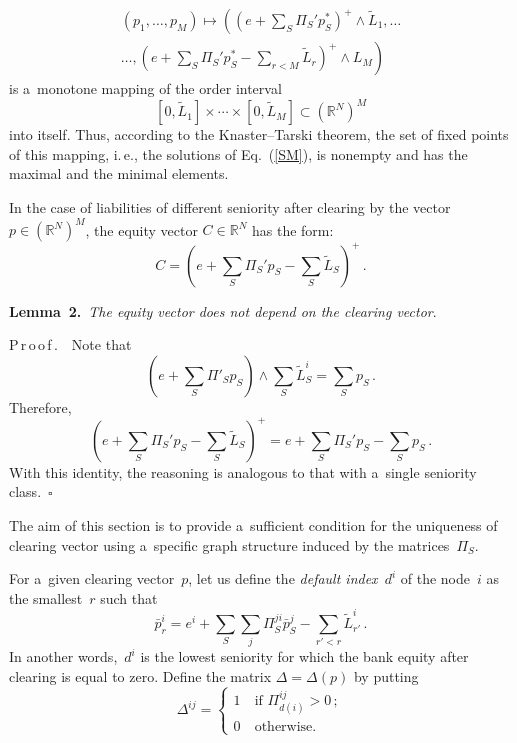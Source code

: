 \begin{multicols}{2}
\vspace*{-4pt}

\noindent
\begin{multline*}
\left(p_1,\ldots,p_M\right)\mapsto \left(
\left(e+\sum\limits_S \Pi_S'p_{S}^* \right)^+\wedge \tilde L_1 
,\ldots\right.\\
\left.\ldots,\left(e+\sum\limits_S \Pi_S'p_{S}^*-\sum\limits_{r<M}\tilde L_r\right)^+ 
\wedge L_M 
\right)
\end{multline*}
is a~monotone mapping of the order interval 
$$
[0,\tilde L_1] \times\cdots\times 
[0,\tilde L_M]\subset (\mathbb{R}^N)^M
$$ 
into itself.
 Thus, according to the Knaster--Tarski theorem, the set of fixed points of this 
mapping, i.\,e., the solutions of Eq.~(\ref{SM}), is nonempty and has the 
maximal and the minimal elements.

In the case of liabilities of different seniority after clearing by the vector 
$p\in (\mathbb{R}^N)^M$,  the equity vector $C\in \mathbb{R}^N$ has the form:
$$
C=\left(e+\sum\limits_S \Pi_S'p_{S}-\sum\limits_S \tilde L_S\right)^+\,.
$$


\noindent
\textbf{Lemma~2.}\
\textit{The equity vector does not depend on the clearing vector}.

\vspace*{2pt}

\noindent
P\,r\,o\,o\,f\,.\ \  Note that
$$
\left(e+\sum\limits_S\Pi'_Sp_S\right)\wedge \sum\limits_S \tilde L^i_S=\sum\limits_S p_S\,.
$$
Therefore,
$$
\left(e+\sum\limits_S \Pi_S'p_{S}-\sum\limits_S \tilde L_S\right)^+=
e+\sum\limits_S \Pi_S'p_{S}-\sum\limits_S  p_{S}\,.
$$
With this identity, the reasoning is analogous to that with a~single seniority 
class.~$\square$

\vspace*{2pt}

The aim of this section is to provide a~sufficient condition for the uniqueness 
of clearing vector using a~specific graph structure induced by the matrices~$\Pi_S$.

For a~given clearing vector~$p$, let us define the \textit{default index}~$d^i$ of the 
node~$i$ as the smallest~$r$  such that
$$
\bar p_r^i=e^i+ \sum\limits_S \sum\limits_j\Pi_S^{ji}\bar p_{S}^j-\sum\limits_{r'< r}\tilde 
L_{r'}^{i}\,.
$$
In another words,~$d^i$ is the lowest seniority for which the bank equity after 
clearing is equal to zero. Define the matrix $\Delta=\Delta(p)$ by putting 
$$
\Delta^{ij}=
\begin{cases}
1 &\ \mbox{if\ \ } \Pi_{d(i)}^{ij}>0\,;\\
0 &\ \mbox{otherwise}.
\end{cases}
$$


\end{multicols}
